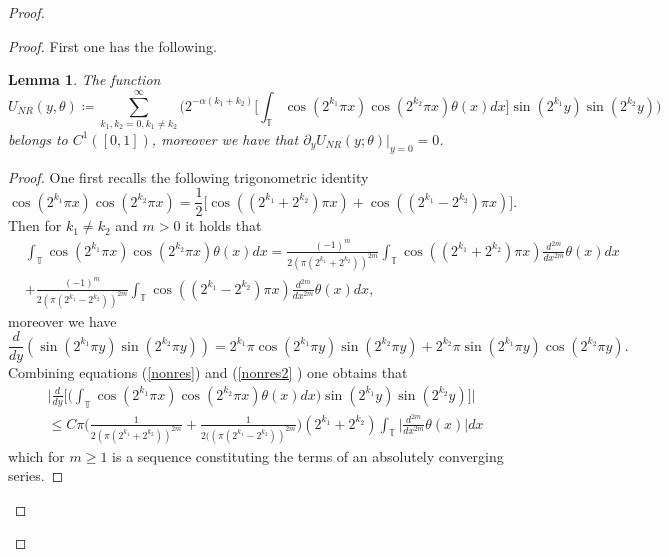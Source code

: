 \documentclass[12pt,a4paper]{article}
\newtheorem{lemma}[theorem]{Lemma}
\theoremstyle{definition}
\theoremstyle{remark}
\numberwithin{equation}{section}
\def \del {\partial}
\begin{document}
\begin{proof}
\begin{proof}
First one has the following.
\begin{lemma}
The function
\begin{equation}
U_{NR} (y,\theta) \coloneqq \sum_{k_1,k_2 = 0,k_1\not=k_2}^\infty \bigg(2^{-\alpha (k_1 + k_2)} \bigg[ \int_{\mathbb{T}} \cos(2^{k_1}  \pi x )  \cos(2^{k_2}  \pi x)\theta (x) dx \bigg] \sin(2^{k_1}y)  \sin(2^{k_2} y)  \bigg)
\end{equation}
belongs to $C^1([0,1])$, moreover we have that $\del_y U_{NR} (y;\theta) \lvert_{y=0} =0$.
\end{lemma}
\begin{proof}
One first recalls the following trigonometric identity
\begin{equation*}
\cos(2^{k_1}  \pi x)  \cos(2^{k_2} \pi x)=\frac12 \bigg[\cos((2^{k_1}+ 2^{k_2})  \pi x) +\cos((2^{k_1}- 2^{k_2}) \pi x)\bigg].
\end{equation*}
Then for $k_1 \neq k_2$ and $m > 0$ it holds that
\begin{equation} \label{nonres}
\begin{aligned}
&\int_{\mathbb{T}} \cos(2^{k_1}  \pi x)  \cos(2^{k_2}  \pi x)\theta (x) dx=\frac{(-1)^{m}}{2( \pi( 2^{k_1}+ 2^{k_2}))^{2m} } \int_{\mathbb{T}}  \cos((2^{k_1}+ 2^{k_2}) \pi x) \frac{d^{2m}}{dx^{2m}}\theta(x) dx\\
&+\frac{(-1)^{m}}{2(\pi(2^{k_1}- 2^{k_2}))^{2m} } \int_{\mathbb{T}} \cos((2^{k_1}- 2^{k_2}) \pi x) \frac{d^{2m}}{dx^{2m}}\theta(x) dx,
\end{aligned}
\end{equation}
moreover we have
\begin{equation}\label{nonres2}
\frac{d}{dy} ( \sin(2^{k_1} \pi y)  \sin(2^{k_2} \pi y) )= 2^{k_1} \pi \cos(2^{k_1} \pi y)  \sin(2^{k_2} \pi y) + 2^{k_2} \pi \sin(2^{k_1} \pi y)  \cos(2^{k_2} \pi y).
\end{equation}
Combining equations (\ref{nonres}) and (\ref{nonres2} ) one obtains that
\begin{equation}
\begin{aligned}
&\bigg\lvert\frac{d}{dy} \bigg[ \bigg( \int_{\mathbb{T}} \cos(2^{k_1}\pi x)  \cos(2^{k_2}\pi x)\theta (x) dx \bigg)  \sin(2^{k_1}y)  \sin(2^{k_2} y) \bigg] \bigg\rvert\\
&\le C \pi \bigg( \frac 1{2(\pi (2^{k_1}+ 2^{k_2}))^{2m} } +
   \frac 1{2((\pi(2^{k_1}- 2^{k_2}))^{2m} } \bigg) (2^{k_1} + 2^{k_2} )\int_{\mathbb{T}} \bigg\lvert\frac{d^{2m}}{dx^{2m}} \theta(x)\bigg\rvert dx 
\end{aligned}
 \end{equation}
which for $m \geq 1$ is a sequence constituting the terms of an absolutely converging series.


\end{proof}
\end{proof}
\end{proof}
\end{document}
